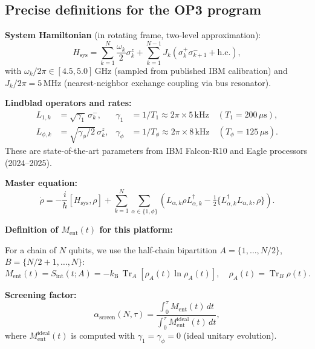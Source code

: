 \documentclass[12pt,letterpaper]{article}
\theoremstyle{plain}
\theoremstyle{definition}
\theoremstyle{remark}
\newcommand{\kB}{k_{\mathrm{B}}}
\newcommand{\asc}{\alpha_{\mathrm{screen}}}
\newcommand{\tr}{\operatorname{Tr}}
\newcommand{\sint}{S_{\mathrm{int}}}
\begin{document}
\subsection{Precise definitions for the OP3 program}

\textbf{System Hamiltonian} (in rotating frame, two-level approximation):
\begin{equation}
  H_{\mathrm{sys}}
  = \sum_{k=1}^{N}\frac{\omega_k}{2}\sigma^z_k
  + \sum_{k=1}^{N-1}J_k\!\left(\sigma^+_k\sigma^-_{k+1} + \mathrm{h.c.}\right),
  \label{eq:H-transmon}
\end{equation}
with $\omega_k/2\pi \in [4.5, 5.0]$\,GHz (sampled from published IBM calibration) and $J_k/2\pi = 5$\,MHz (nearest-neighbor exchange coupling via bus resonator).

\textbf{Lindblad operators and rates:}
\begin{align}
  L_{1,k} &= \sqrt{\gamma_1}\,\sigma^-_k,
  & \gamma_1 &= 1/T_1 \approx 2\pi\times5\,\text{kHz} \quad (T_1 = 200\,\mu\text{s}),
  \label{eq:L1} \\
  L_{\phi,k} &= \sqrt{\gamma_\phi/2}\,\sigma^z_k,
  & \gamma_\phi &= 1/T_\phi \approx 2\pi\times8\,\text{kHz} \quad (T_\phi = 125\,\mu\text{s}).
  \label{eq:Lphi}
\end{align}
These are state-of-the-art parameters from IBM Falcon-R10 and Eagle processors (2024--2025).

\textbf{Master equation:}
\begin{equation}
  \dot{\rho}
  = -\frac{i}{\hbar}[H_{\mathrm{sys}},\rho]
  + \sum_{k=1}^{N}\sum_{\alpha\in\{1,\phi\}}
    \!\left(L_{\alpha,k}\rho L_{\alpha,k}^\dagger
    - \tfrac{1}{2}\{L_{\alpha,k}^\dagger L_{\alpha,k},\rho\}\right).
  \label{eq:lindblad}
\end{equation}

\textbf{Definition of $M_{\mathrm{ent}}(t)$ for this platform:}

For a chain of $N$ qubits, we use the half-chain bipartition $A = \{1,\ldots,N/2\}$, $B = \{N/2+1,\ldots,N\}$:
\begin{equation}
  M_{\mathrm{ent}}(t) = \sint(t; A) = -\kB\,\tr_A[\rho_A(t)\ln\rho_A(t)],
  \quad \rho_A(t) = \tr_B\rho(t).
  \label{eq:Ment-def}
\end{equation}

\textbf{Screening factor:}
\begin{equation}
  \asc(N,\tau) = \frac{\int_0^\tau M_{\mathrm{ent}}(t)\,dt}{\int_0^\tau M_{\mathrm{ent}}^{\mathrm{ideal}}(t)\,dt},
  \label{eq:asc-def}
\end{equation}
where $M_{\mathrm{ent}}^{\mathrm{ideal}}(t)$ is computed with $\gamma_1 = \gamma_\phi = 0$ (ideal unitary evolution).
\end{document}
